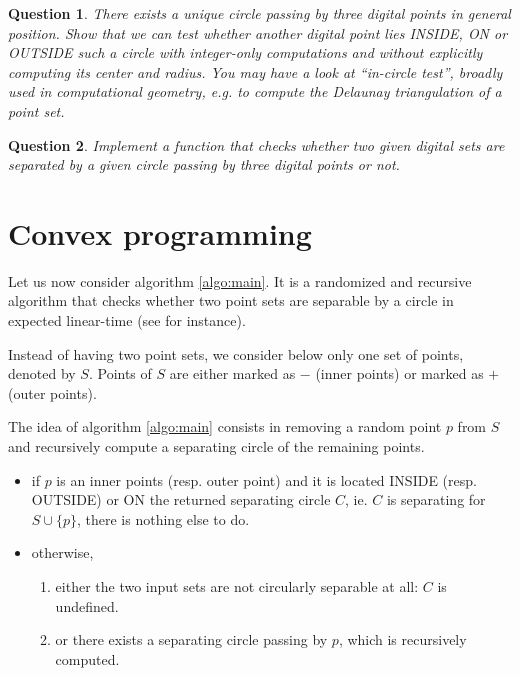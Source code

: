 \documentclass[a4paper, 11pt]{article}
\newtheorem{qu}{Question}
\begin{document}
\begin{qu}
There exists a unique circle passing by three digital points in general position. Show that we can test whether another digital
point lies INSIDE, ON or OUTSIDE such a circle with integer-only computations and without explicitly computing 
its center and radius. You may have a look at ``in-circle test'', broadly used in computational geometry, e.g. 
to compute the Delaunay triangulation of a point set.  
\end{qu}

\begin{qu}
Implement a function that checks whether two given digital sets are separated by a given circle passing by three
digital points or not.  
\end{qu}

\section{Convex programming}

Let us now consider algorithm \ref{algo:main}. 
It is a randomized and recursive algorithm that checks whether two point sets
 are separable by a circle in expected linear-time (see \cite{Welzl1991} for instance). 

Instead of having two point sets, we consider below only one set of points, denoted by $S$. 
Points of $S$ are either marked as $-$ (inner points) or marked as $+$ (outer points). 
  
The idea of algorithm \ref{algo:main} consists in removing a random point $p$ from $S$ 
and recursively compute a separating circle of the remaining points. 
\begin{itemize}
\item if $p$ is an inner points (resp. outer point) and it is located INSIDE (resp. OUTSIDE) or ON 
the returned separating circle $C$, ie. $C$ is separating for $S \cup \{p\}$, there is nothing else to do.
\item otherwise, 
 \begin{enumerate}
   \item either the two input sets are not circularly separable at all: $C$ is undefined.   
   \item or there exists a separating circle passing by $p$, which is recursively computed.  
 \end{enumerate}
\end{itemize}
\end{document}
